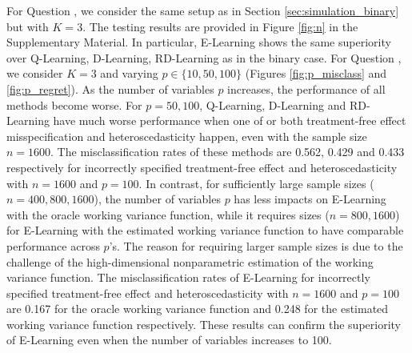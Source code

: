 \documentclass[11pt]{article}
\theoremstyle{definition}
\theoremstyle{remark}
\begin{document}
For Question , we consider the same setup as in Section \ref{sec:simulation_binary} but with $ K = 3 $. The testing results are provided in Figure \ref{fig:n} in the Supplementary Material. In particular, E-Learning shows the same superiority over Q-Learning, D-Learning, RD-Learning as in the binary case.
For Question , we consider $ K = 3 $ and varying $ p \in \{10,50,100\} $ (Figures \ref{fig:p_misclass} and \ref{fig:p_regret}). As the number of variables $ p $ increases, the performance of all methods become worse. For $ p=50,100 $, Q-Learning, D-Learning and RD-Learning have much worse performance when one of or both treatment-free effect misspecification and heteroscedasticity happen, even with the sample size $ n = 1600 $. The misclassification rates of these methods are 0.562, 0.429 and 0.433 respectively for incorrectly specified treatment-free effect and heteroscedasticity with $ n = 1600 $ and $ p = 100 $. In contrast, for sufficiently large sample sizes ($ n = 400, 800, 1600 $), the number of variables $ p $ has less impacts on E-Learning with the oracle working variance function, while it requires 
sizes ($ n = 800, 1600 $) for E-Learning with the estimated working variance function to have comparable performance across $ p $'s. The reason for requiring larger sample sizes is due to the challenge of the high-dimensional nonparametric estimation of the working variance function. The misclassification rates of E-Learning for incorrectly specified treatment-free effect and heteroscedasticity with $ n = 1600 $ and $ p = 100 $ are 0.167 for the oracle working variance function and 0.248 for the estimated working variance function respectively. These results can confirm the superiority of E-Learning even when the number of variables increases to 100.
\end{document}
